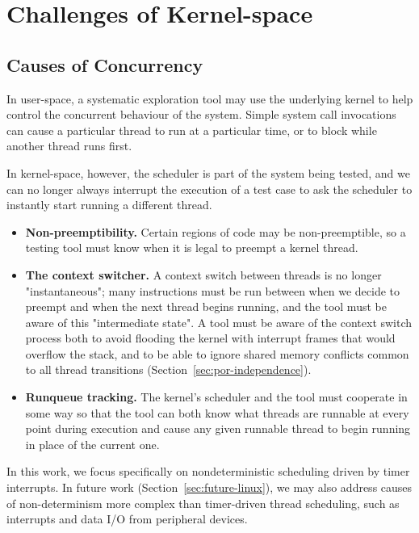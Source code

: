 \section{Challenges of Kernel-space}

\subsection{Causes of Concurrency}

In user-space, a systematic exploration tool may use the underlying kernel to help control the concurrent behaviour of the system\cite{dbug-ssv}. Simple system call invocations can cause a particular thread to run at a particular time, or to block while another thread runs first.

In kernel-space, however, the scheduler is part of the system being tested, and we can no longer always interrupt the execution of a test case to ask the scheduler to instantly start running a different thread.
\begin{itemize}
	\item {\bf Non-preemptibility.} Certain regions of code may be non-preemptible, so a testing tool must know when it is legal to preempt a kernel thread.
	\item {\bf The context switcher.} A context switch between threads is no longer "instantaneous"; many instructions must be run between when we decide to preempt and when the next thread begins running, and the tool must be aware of this "intermediate state". A tool must be aware of the context switch process both to avoid flooding the kernel with interrupt frames that would overflow the stack, and to be able to ignore shared memory conflicts common to all thread transitions (Section~\ref{sec:por-independence}).
	\item {\bf Runqueue tracking.} The kernel's scheduler and the tool must cooperate in some way so that the tool can both know what threads are runnable at every point during execution and cause any given runnable thread to begin running in place of the current one.
\end{itemize}

In this work, we focus specifically on nondeterministic scheduling driven by timer interrupts. In future work (Section~\ref{sec:future-linux}), we may also address causes of non-determinism more complex than timer-driven thread scheduling, such as interrupts and data I/O from peripheral devices.

